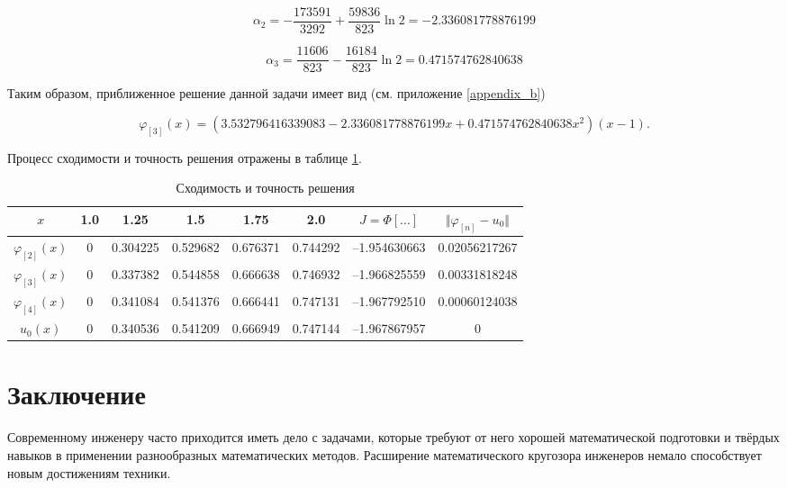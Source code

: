 \documentclass{article}
\begin{document}
\begin{displaymath}
	\alpha_{2} = -\frac{173591}{3292} + \frac{59836}{823}\ln{2} = -2.336081778876199
\end{displaymath}

\begin{displaymath}
	\alpha_{3} = \frac{11606}{823} - \frac{16184}{823}\ln{2} = 0.471574762840638
\end{displaymath}

\noindent Таким образом, приближенное решение данной задачи имеет вид (см. приложение \ref{appendix_b})

\begin{displaymath}
	\varphi_{[3]}(x) = (3.532796416339083 - 2.336081778876199x + 0.471574762840638 x^2)(x-1).
\end{displaymath}

Процесс сходимости и точность решения отражены в таблице \ref{table_process_of_convergence_rank_3}.

\begin{table}[!h]
\centering
\begin{tabular}{|c|c|c|c|c|c|c|c|}
	\hline
	$x$ & 1.0 & 1.25 & 1.5 & 1.75 & 2.0 & $J = \Phi[\ldots]$ & $\Vert \varphi_{[n]} - u_{0} \Vert$ \\
	\hline \hline

	$\varphi_{[2]}(x)$ & 0 & 0.304225 & 0.529682 & 0.676371 & 0.744292 & –1.954630663 & 0.02056217267 \\	\hline
	$\varphi_{[3]}(x)$ & 0 & 0.337382 & 0.544858 & 0.666638 & 0.746932 & –1.966825559 & 0.00331818248 \\	\hline
	$\varphi_{[4]}(x)$ & 
0 & 0.341084 & 0.541376 & 0.666441 & 0.747131 & –1.967792510 & 0.00060124038 \\	\hline
	$u_{0}(x)$ & 0 & 0.340536 & 0.541209 & 0.666949 & 0.747144 & –1.967867957 & 0 \\	\hline

\end{tabular}
\caption{Сходимость и точность решения}
\label{table_process_of_convergence_rank_3}
\end{table}

\newpage

\section*{Заключение}

Современному инженеру часто приходится иметь дело с задачами, которые требуют от него хорошей математической подготовки и твёрдых навыков в применении разнообразных математических методов. Расширение математического кругозора инженеров немало способствует новым достижениям техники.
\end{document}
